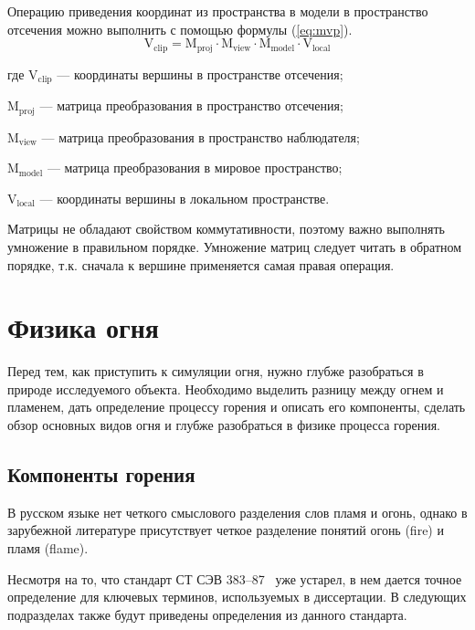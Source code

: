 Операцию приведения координат из пространства в модели в пространство отсечения
можно выполнить с помощью формулы (\ref{eq:mvp}).
\begin{equation}
  \label{eq:mvp}
  \text{V}_\text{clip} = \text{M}_\text{proj} \cdot \text{M}_\text{view} \cdot
  \text{M}_\text{model} \cdot \text{V}_\text{local}
\end{equation}
\begin{explanationx}
    \item [где] $\text{V}_\text{clip}$ --- координаты вершины в пространстве
        отсечения;
    \item $\text{M}_\text{proj}$ --- матрица преобразования в пространство
        отсечения;
    \item $\text{M}_\text{view}$ --- матрица преобразования в пространство
        наблюдателя;
    \item $\text{M}_\text{model}$ --- матрица преобразования в мировое
        пространство;
    \item $\text{V}_\text{local}$ --- координаты вершины в локальном
        пространстве.
\end{explanationx}

Матрицы не обладают свойством коммутативности, поэтому важно выполнять умножение
в правильном порядке. Умножение матриц следует читать в обратном порядке,
т\@.к\@. сначала к вершине применяется самая правая операция.

\section{Физика огня}

Перед тем, как приступить к симуляции огня, нужно глубже разобраться в природе
исследуемого объекта. Необходимо выделить разницу между огнем и пламенем,
дать определение процессу горения и описать его компоненты, сделать обзор
основных видов огня и глубже разобраться в физике процесса горения.

\subsection{Компоненты горения}

В русском языке нет четкого смыслового разделения слов пламя и
огонь\break{}\cite{WikiFlame}, однако в зарубежной литературе присутствует четкое
разделение понятий огонь (fire) и пламя (flame).

Несмотря на то, что стандарт СТ СЭВ 383--87~\cite{383-87} уже устарел, в нем
дается точное определение для ключевых терминов, используемых в диссертации. В
следующих подразделах также будут приведены определения из данного стандарта.

